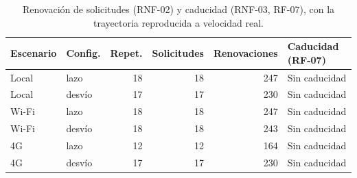 \begin{table}[H]
\centering
\caption{Renovación de solicitudes (RNF-02) y caducidad (RNF-03, RF-07), con la trayectoria reproducida a velocidad real.}
\label{tab:renovacion_campana}
\small
\begin{tabular}{llrrrl}
\toprule
\textbf{Escenario} & \textbf{Config.} & \textbf{Repet.} & \textbf{Solicitudes} & \textbf{Renovaciones} & \textbf{Caducidad (RF-07)} \\
\midrule
Local & lazo & 18 & 18 & 247 & Sin caducidad \\
Local & desvío & 17 & 17 & 230 & Sin caducidad \\
Wi-Fi & lazo & 18 & 18 & 247 & Sin caducidad \\
Wi-Fi & desvío & 18 & 18 & 243 & Sin caducidad \\
4G & lazo & 12 & 12 & 164 & Sin caducidad \\
4G & desvío & 17 & 17 & 230 & Sin caducidad \\
\bottomrule
\end{tabular}
\end{table}

